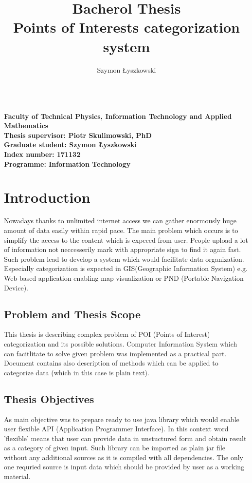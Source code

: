\documentclass[12pt,a4paper,twoside,onecolumn,titlepage]{report}
\title {Bacherol Thesis
\\Points of Interests categorization system}
\author{Szymon Łyszkowski}
\begin{document}
\maketitle

\textbf{
		\\Faculty of Technical Physics, Information Technology and Applied \\Mathematics
		\\Thesis supervisor: Piotr Skulimowski, PhD
		\\Graduate student: Szymon Łyszkowski
		\\Index number: 171132
		\\Programme: Information Technology
	}


\tableofcontents

\chapter{Introduction} \label{chap.introduction} 
{Nowadays thanks to unlimited internet access we can gather enormously huge amount of data easily within rapid pace. The main problem which occurs is to simplify the access to the content which is expeced from user. People upload a lot of information not neccesserily mark with appropriate sign to find it again fast. Such problem lead to develop a system which would facilitate data organization. Especially categorization is expected in GIS(Geographic Information System) e.g. Web-based application enabling map visualization or PND (Portable Navigation Device).

}


\section{Problem and Thesis Scope}
This thesis is describing complex problem of POI (Points of Interest) categorization and its possible solutions. Computer Information System which can facitlitate to solve given problem was implemented as a practical part. Document contains also description of methods which can be applied to categorize data (which in this case is plain text). 

\section{Thesis Objectives}
As main objective was to prepare ready to use java library which would enable user flexible API (Application Programmer Interface). In this context word 'flexible' means that user can provide data in unstuctured form and obtain result as a category of given input. Such library can be imported as plain jar file without any additional sources as it is compiled with all dependencies. The only one requried source is input data which should be provided by user as a working material. 
\end{document}
